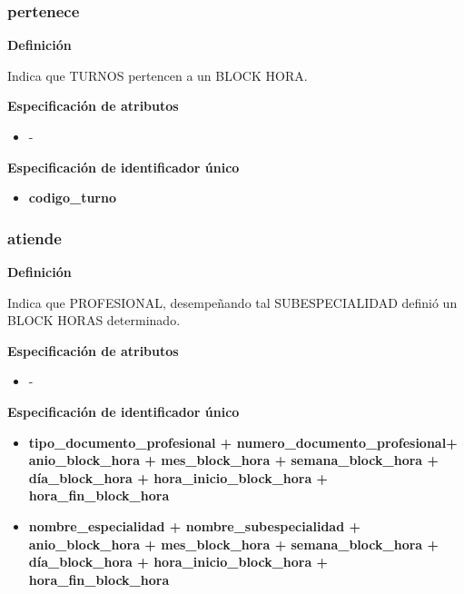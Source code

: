 \documentclass[a4paper,11pt]{article}
\begin{document}
\subsubsection{\textbf{pertenece}}

\textbf{Definición}

Indica que TURNOS pertencen a un BLOCK HORA.

\textbf{Especificación de atributos}

\begin{itemize}

    \item -

\end{itemize}

\textbf{Especificación de identificador único}

\begin{itemize}

    \item \textbf{codigo\_turno}

\end{itemize}

\subsubsection{\textbf{atiende}}

\textbf{Definición}

Indica que PROFESIONAL, desempeñando tal SUBESPECIALIDAD definió un BLOCK 
HORAS determinado.

\textbf{Especificación de atributos}

\begin{itemize}

    \item -

\end{itemize}

\textbf{Especificación de identificador único}

\begin{itemize}

     \item \textbf{tipo\_documento\_profesional + numero\_documento\_profesional+ anio\_block\_hora + mes\_block\_hora + semana\_block\_hora + día\_block\_hora + hora\_inicio\_block\_hora + hora\_fin\_block\_hora}

     \item \textbf{nombre\_especialidad + nombre\_subespecialidad + anio\_block\_hora + mes\_block\_hora + semana\_block\_hora + día\_block\_hora + hora\_inicio\_block\_hora + hora\_fin\_block\_hora} 

\end{itemize}
\end{document}
